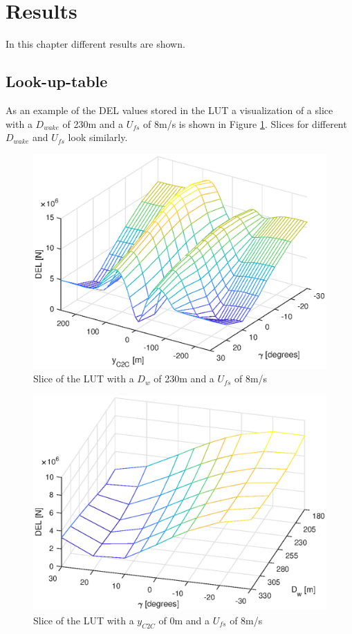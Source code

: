 \section{Results}

In this chapter different results are shown.

\subsection{Look-up-table}
As an example of the DEL values stored in the LUT a visualization of a slice with a $D_{wake}$ of 230m and a $U_{fs}$ of 8m/s is shown in Figure \ref{fig:LUTsliceC2C}. Slices for different $D_{wake}$ and $U_{fs}$ look similarly.

\begin{figure}
	\includegraphics[width=\linewidth]{./Figures/LUTslice_Dw230_Ufs8.eps}
	\caption{Slice of the LUT with a $D_{w}$ of 230m and a $U_{fs}$ of 8m/s }
	\label{fig:LUTsliceC2C}
\end{figure}

\begin{figure}
	\includegraphics[width=\linewidth]{./Figures/LUTslice_yWake0_Ufs8.eps}
	\caption{Slice of the LUT with a $y_{C2C}$ of 0m and a $U_{fs}$ of 8m/s }
	\label{fig:LUTsliceDw}
\end{figure}

